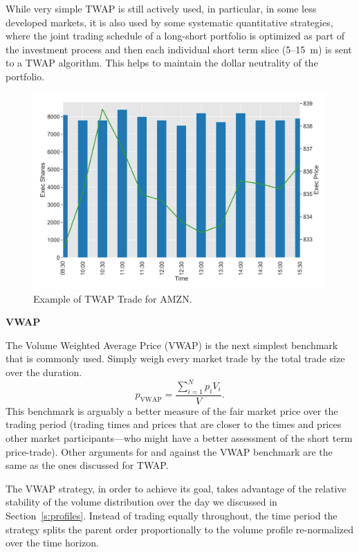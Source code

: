 While very simple TWAP is still actively used, in particular, in some less developed markets, it is also used by some systematic quantitative strategies, where the joint trading schedule of a long-short portfolio is optimized as part of the investment process and then each individual short term slice (5--15~m) is sent to a TWAP algorithm. This helps to maintain the dollar neutrality of the portfolio. \twomedskip

        \begin{figure}[!ht]
        \centering
        \includegraphics[width=\textwidth]{chapters/chapter_exec_models/figures/twap.png} 
        \caption{Example of TWAP Trade for AMZN.\label{fig:twap_amzn}}
        \end{figure} \twomedskip


\noindent\textbf{VWAP} \label{in:vwap} \twomedskip


The Volume Weighted Average Price (VWAP) is the next simplest benchmark that is commonly used. Simply weigh every market trade by the total trade size over the duration.
        \begin{equation} \label{eq:vwapstet}
        p_\text{VWAP}= \dfrac{ \sum_{i=1}^N p_i V_i}{V}.
        \end{equation}
This benchmark  is arguably a better measure of the fair market price over the trading period (trading times and prices that are closer to the times and prices other market participants---who might have a better assessment of the short term price-trade). Other arguments for and against the VWAP benchmark are the same as the ones discussed for TWAP. 


The VWAP strategy, in order to achieve its goal, takes advantage of the relative stability of the volume distribution over the day we discussed in Section~\ref{s:profiles}. Instead of trading equally throughout, the time period the strategy splits the parent order proportionally to the volume profile re-normalized over the time horizon.


